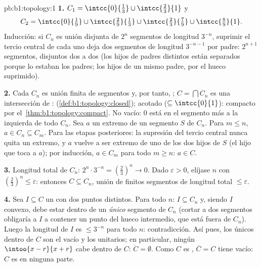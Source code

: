 \begin{solution}{pb:b1:topology:1}
\textbf{1.} $C_1 = \intcc{0}{\frac13} \cup \intcc{\frac23}{1}$
y
\[
C_2 = \intcc{0}{\tfrac19} \cup \intcc{\tfrac29}{\tfrac13}
\cup \intcc{\tfrac23}{\tfrac79} \cup \intcc{\tfrac89}{1} .
\]
Inducción: si $C_n$ es unión disjunta de $2^n$ segmentos  de
longitud $3^{-n}$, suprimir el tercio central  de cada uno deja
dos segmentos  de longitud $3^{-n-1}$ por padre: $2^{n+1}$
segmentos, disjuntos dos a dos (los hijos de padres distintos están
separados porque lo estaban los padres; los hijos de un mismo padre,
por el hueco suprimido).

\textbf{2.} Cada $C_n$ es unión finita de segmentos y, por tanto,
; $C = \bigcap C_n$ es una intersección de :
 (\cref{def:b1:topology:closed}); acotado
($\subseteq \intcc{0}{1}$): compacto por
el~\cref{thm:b1:topology:compact}. No vacío: $0$ está en el segmento
más a la izquierda de todo $C_n$. Sea $a$ un extremo de un segmento
$S$ de $C_n$. Para $m \leq n$, $a \in C_n \subseteq C_m$. Para las
etapas posteriores: la supresión del tercio central nunca quita un
extremo, y $a$ vuelve a ser extremo de uno de los dos hijos de $S$
(el hijo que toca a $a$); por inducción, $a \in C_m$ para todo
$m \geq n$: $a \in C$.

\textbf{3.} Longitud total de $C_n$: $2^n \cdot 3^{-n} =
(\frac23)^n \to 0$. Dado $\varepsilon > 0$, elíjase $n$ con
$(\frac23)^n \leq \varepsilon$: entonces $C \subseteq C_n$, unión de
finitos segmentos de longitud total $\leq \varepsilon$.

\textbf{4.} Sea $I \subseteq C$ un  con dos puntos
distintos. Para todo $n$: $I \subseteq C_n$ y, siendo $I$ convexo,
debe estar dentro de un \emph{único} segmento de $C_n$ (cortar a dos
segmentos obligaría a $I$ a contener un punto del hueco intermedio,
que está fuera de $C_n$). Luego la longitud de $I$ es $\leq 3^{-n}$
para todo $n$: contradicción. Así pues, los únicos  dentro
de $C$ son el vacío y los unitarios; en particular, ningún
$\intoo{x-r}{x+r}$ cabe dentro de $C$: $\mathring C = \emptyset$.
Como $C$ es , $\overline C = C$ tiene  vacío: $C$ es
 en ninguna parte.


\end{solution}
